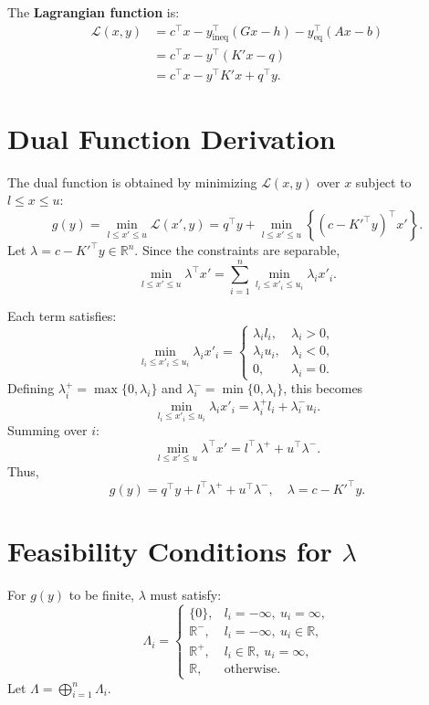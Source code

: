 \documentclass[twoside,12pt,openright]{report}  %
\begin{document}
The \textbf{Lagrangian function} is:
\[
\begin{aligned}
\mathcal{L}(x, y) 
&= c^\top x - y_{\mathrm{ineq}}^\top (Gx - h) - y_{\mathrm{eq}}^\top (Ax - b) \\
&= c^\top x - y^\top (K' x - q) \\
&= c^\top x - y^\top K' x + q^\top y.
\end{aligned}
\]

\section{Dual Function Derivation}
The dual function is obtained by minimizing $\mathcal{L}(x, y)$ over $x$ subject to $l \le x \le u$:
\[
g(y) = \min_{l \le x' \le u} \mathcal{L}(x', y)
      = q^\top y + \min_{l \le x' \le u} \left\{ (c - K'^\top y)^\top x' \right\}.
\]
Let $\lambda = c - K'^\top y \in \mathbb{R}^n$. Since the constraints are separable,
\[
\min_{l \le x' \le u} \lambda^\top x' 
= \sum_{i=1}^n \min_{l_i \le x'_i \le u_i} \lambda_i x'_i.
\]

Each term satisfies:
\[
\min_{l_i \le x'_i \le u_i} \lambda_i x'_i =
\begin{cases}
\lambda_i l_i, & \lambda_i > 0, \\
\lambda_i u_i, & \lambda_i < 0, \\
0, & \lambda_i = 0.
\end{cases}
\]
Defining $\lambda^+_i = \max\{0, \lambda_i\}$ and $\lambda^-_i = \min\{0, \lambda_i\}$, this becomes
\[
\min_{l_i \le x'_i \le u_i} \lambda_i x'_i = \lambda_i^+ l_i + \lambda_i^- u_i.
\]
Summing over $i$:
\[
\min_{l \le x' \le u} \lambda^\top x' = l^\top \lambda^+ + u^\top \lambda^-.
\]
Thus,
\[
g(y) = q^\top y + l^\top \lambda^+ + u^\top \lambda^-, \quad \lambda = c - K'^\top y.
\]

\section{Feasibility Conditions for $\lambda$}
For $g(y)$ to be finite, $\lambda$ must satisfy:
\[
\Lambda_i =
\begin{cases}
\{0\}, & l_i = -\infty, \ u_i = \infty, \\
\mathbb{R}^-, & l_i = -\infty, \ u_i \in \mathbb{R}, \\
\mathbb{R}^+, & l_i \in \mathbb{R}, \ u_i = \infty, \\
\mathbb{R}, & \text{otherwise}.
\end{cases}
\]
Let $\Lambda = \bigoplus_{i=1}^n \Lambda_i$.
\end{document}
